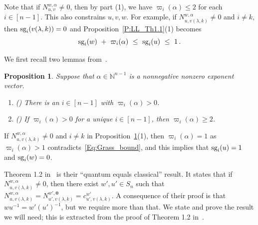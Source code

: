 \documentclass[12pt,oneside,reqno]{amsart}
\newtheorem{proposition}[theorem]{Proposition}
\theoremstyle{definition}
\numberwithin{equation}{section}
\newcommand{\NN}{{\mathbb N}}
\newcommand{\bzero}{{\mathbf 0}}
\newcommand{\sg}{{\mbox{\rm sg}}}
\begin{document}
Note that if $N^{w,\alpha}_{u,v}\neq 0$, then by part (1), we have $\varpi_i(\alpha)\leq 2$ for each $i\in[n{-}1]$.
This also constrains $u,v,w$.
For example, if $N^{w,\alpha}_{u,v(\lambda,k)}\neq 0$ and $i\neq k$,  then $\sg_i(v(\lambda,k))=0$ and
Proposition~\ref{P:LL_Th1.1}(1) becomes 
%
\begin{equation}\label{Eq:Grass_bound}
  \sg_i(w)\ +\ \varpi_i(\alpha)\ \leq\ \sg_i(u)\ \leq\ 1\,.
\end{equation}


We first recall two lemmas from~\cite{LeungLi2012}.

\begin{proposition}\label{P:LL_lemmas}
   Suppose that $\alpha\in\NN^{n-1}$ is a nonnegative nonzero  exponent vector.
   \begin{enumerate}
   \item  \emph{(\cite[Lemma 2.8]{LeungLi2012})}
        There is an $i\in[n{-}1]$ with $\varpi_i(\alpha)>0$.
    \item  \emph{(\cite[Lemma 2.10]{LeungLi2012})}
        If $\varpi_i(\alpha)>0$ for a unique $i\in[n{-}1]$, then $\varpi_i(\alpha)\geq 2$.
   \end{enumerate}
\end{proposition}

If $N^{w,\alpha}_{u,v(\lambda,k)}\neq 0$ and $i\neq k$ in Proposition~\ref{P:LL_lemmas}(1), then $\varpi_i(\alpha)=1$ as
$\varpi_i(\alpha)>1$ 
contradicts~\eqref{Eq:Grass_bound}, and this implies that  $\sg_i(u)=1$ and $\sg_i(w)=0$.


Theorem 1.2 in~\cite{LeungLi2012} is their ``quantum equals classical'' result.
It states that if $N^{w, \alpha}_{u,v(\lambda,k)}\neq 0$, then there exist $w',u'\in S_n$ such
that  $N^{w, \alpha}_{u,v(\lambda,k)}=N^{w', {\bzero}}_{u',v(\lambda,k)}= c^{w'}_{u',v(\lambda,k)}$.
A consequence of their proof is that $w u^{-1}=w'(u')^{-1}$, but we require more than that.
We state and prove the result we will need; this is extracted from the proof of Theorem 1.2 in~\cite{LeungLi2012}.
\end{document}
